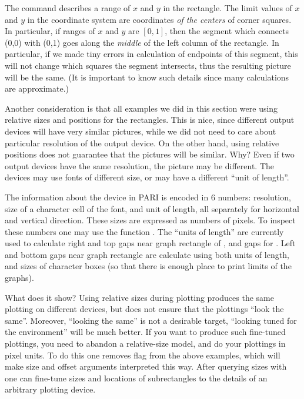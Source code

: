 The command  describes a range of $x$ and $y$ in the
rectangle.  The limit values of $x$ and $y$ in the coordinate system are
coordinates \emph{of the centers} of corner squares.  In particular,
if ranges of $x$ and $y$ are $[0,1]$, then the segment which connects (0,0)
with (0,1) goes along the \emph{middle} of the left column of the rectangle.
In particular, if we made tiny errors in calculation of endpoints of this
segment, this will not change which squares the segment intersects, thus
the resulting picture will be the same.  (It is important to know such details
since many calculations are approximate.)

Another consideration is that all examples we did in this section were
using relative sizes and positions for the rectangles.  This is nice, since
different output devices will have very similar pictures, while we
did not need to care about particular resolution of the output device.
On the other hand,
using relative positions does not guarantee that the pictures will be
similar.  Why?  Even if two output devices have the same resolution,
the picture may be different.  The devices may use fonts of different
size, or may have a different ``unit of length''.

The information about the device in PARI is encoded in 6 numbers: resolution,
size of a character cell of the font, and unit of length, all separately
for horizontal and vertical direction.  These sizes are expressed as
numbers of pixels.  To inspect these numbers one may use the function
.  The ``units of length'' are currently used to calculate
right and top gaps near graph rectangle of , and gaps for
.  Left and bottom gaps near graph rectangle are calculate
using both units of length, and sizes of character boxes (so that there
is enough place to print limits of the graphs).

What does it show?  Using relative sizes during plotting produces
 the same plotting on different devices, but does not
ensure that the plottings ``look the same''.  Moreover, ``looking the
same'' is not a desirable target, ``looking tuned for the environment''
will be much better.  If you want to produce such fine-tuned plottings,
you need to abandon a relative-size model, and do your plottings in
pixel units.  To do this one removes flag  from the above
examples, which will make size and offset arguments interpreted this way.
After querying sizes with  one can fine-tune sizes and
locations of subrectangles to the details of an arbitrary plotting
device.

